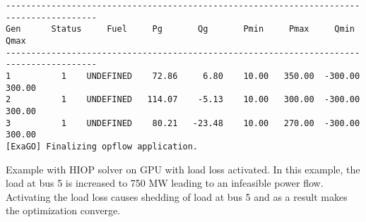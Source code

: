 \begin{lstlisting}
----------------------------------------------------------------------------------------
Gen      Status     Fuel     Pg       Qg       Pmin     Pmax     Qmin     Qmax  
----------------------------------------------------------------------------------------
1          1    UNDEFINED    72.86     6.80    10.00   350.00  -300.00   300.00
2          1    UNDEFINED   114.07    -5.13    10.00   300.00  -300.00   300.00
3          1    UNDEFINED    80.21   -23.48    10.00   270.00  -300.00   300.00
[ExaGO] Finalizing opflow application.
\end{lstlisting}

Example with HIOP solver on GPU with load loss activated. In this example, the load at bus 5 is
increased to 750 MW leading to an infeasible power flow. Activating the load loss causes shedding
of load at bus 5 and as a result makes the optimization converge.

